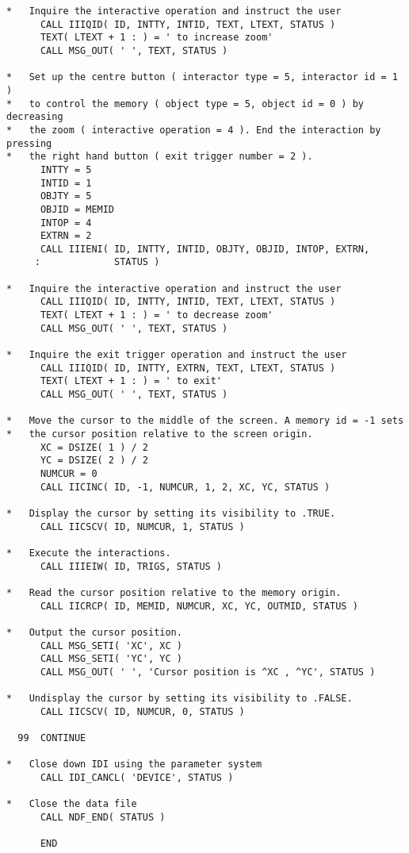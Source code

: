 \begin{small}
\begin{verbatim}
*   Inquire the interactive operation and instruct the user
      CALL IIIQID( ID, INTTY, INTID, TEXT, LTEXT, STATUS )
      TEXT( LTEXT + 1 : ) = ' to increase zoom'
      CALL MSG_OUT( ' ', TEXT, STATUS )

*   Set up the centre button ( interactor type = 5, interactor id = 1 )
*   to control the memory ( object type = 5, object id = 0 ) by decreasing
*   the zoom ( interactive operation = 4 ). End the interaction by pressing
*   the right hand button ( exit trigger number = 2 ).
      INTTY = 5
      INTID = 1
      OBJTY = 5
      OBJID = MEMID
      INTOP = 4
      EXTRN = 2
      CALL IIIENI( ID, INTTY, INTID, OBJTY, OBJID, INTOP, EXTRN,
     :             STATUS )

*   Inquire the interactive operation and instruct the user
      CALL IIIQID( ID, INTTY, INTID, TEXT, LTEXT, STATUS )
      TEXT( LTEXT + 1 : ) = ' to decrease zoom'
      CALL MSG_OUT( ' ', TEXT, STATUS )

*   Inquire the exit trigger operation and instruct the user
      CALL IIIQID( ID, INTTY, EXTRN, TEXT, LTEXT, STATUS )
      TEXT( LTEXT + 1 : ) = ' to exit'
      CALL MSG_OUT( ' ', TEXT, STATUS )

*   Move the cursor to the middle of the screen. A memory id = -1 sets
*   the cursor position relative to the screen origin.
      XC = DSIZE( 1 ) / 2
      YC = DSIZE( 2 ) / 2
      NUMCUR = 0
      CALL IICINC( ID, -1, NUMCUR, 1, 2, XC, YC, STATUS )

*   Display the cursor by setting its visibility to .TRUE.
      CALL IICSCV( ID, NUMCUR, 1, STATUS )

*   Execute the interactions.
      CALL IIIEIW( ID, TRIGS, STATUS )

*   Read the cursor position relative to the memory origin.
      CALL IICRCP( ID, MEMID, NUMCUR, XC, YC, OUTMID, STATUS )

*   Output the cursor position.
      CALL MSG_SETI( 'XC', XC )
      CALL MSG_SETI( 'YC', YC )
      CALL MSG_OUT( ' ', 'Cursor position is ^XC , ^YC', STATUS )

*   Undisplay the cursor by setting its visibility to .FALSE.
      CALL IICSCV( ID, NUMCUR, 0, STATUS )

  99  CONTINUE

*   Close down IDI using the parameter system
      CALL IDI_CANCL( 'DEVICE', STATUS )

*   Close the data file
      CALL NDF_END( STATUS )

      END
\end{verbatim}
\end{small}

